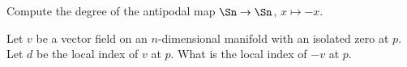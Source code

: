 \begin{alist}
\item Compute the degree of the antipodal map $\Sn\rightarrow \Sn$,
$x\mapsto -x$.
\item Let $v$ be a vector field on an $n$-dimensional manifold with an
isolated zero at $p$. Let $d$ be the local index of $v$ at $p$.  What
is the local index of $-v$ at $p$.
\end{alist}
